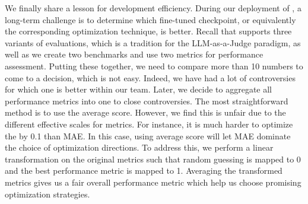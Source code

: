 
We finally share a lesson for development efficiency. During our deployment of \modelname, a long-term challenge is to determine which fine-tuned checkpoint, or equivalently the corresponding optimization technique, is better. Recall that \modelname supports three variants of evaluations, which is a tradition for the LLM-as-a-Judge paradigm, as well as we create two benchmarks and use two metrics for performance assessment. Putting these together, we need to compare more than 10 numbers to come to a decision, which is not easy. Indeed, we have had a lot of controversies for which one is better within our team. Later, we decide to aggregate all performance metrics into one to close controversies. The most straightforward method is to use the average score. However, we find this is unfair due to the different effective scales for metrics. For instance, it is much harder to optimize the  by 0.1 than MAE. In this case, using average score will let MAE dominate the choice of optimization directions. 
To address this, we perform a linear transformation on the original metrics such that random guessing is mapped to 0 and the best performance metric is mapped to 1. Averaging the  transformed metrics gives us a fair overall performance metric which help us choose promising optimization strategies.

